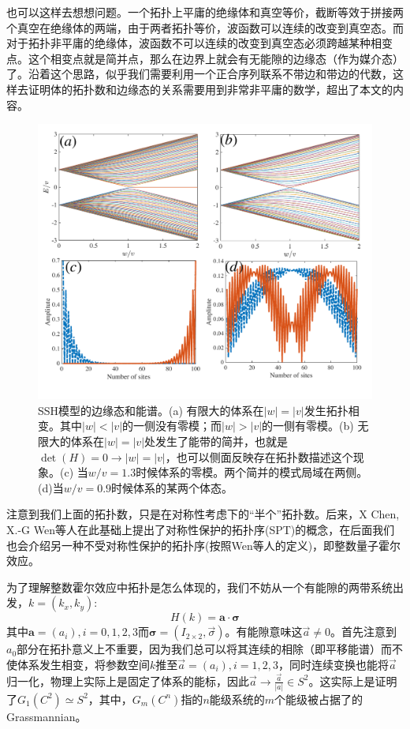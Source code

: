 \documentclass[supercite]{HustGraduPaper}
\begin{document}
也可以这样去想想问题。一个拓扑上平庸的绝缘体和真空等价，截断等效于拼接两个真空在绝缘体的两端，由于两者拓扑等价，波函数可以连续的改变到真空态。而对于拓扑非平庸的绝缘体，波函数不可以连续的改变到真空态必须跨越某种相变点。这个相变点就是简并点，那么在边界上就会有无能隙的边缘态（作为媒介态）了。沿着这个思路，似乎我们需要利用一个正合序列联系不带边和带边的代数，这样去证明体的拓扑数和边缘态的关系需要用到非常非平庸的数学，超出了本文的内容。

\begin{figure}
	\centering
	\includegraphics[width=1\linewidth]{Figures/Fig_wave_no}
	\caption{SSH模型的边缘态和能谱。(a) 有限大的体系在$|w| = |v|$发生拓扑相变。其中$|w|<|v|$的一侧没有零模；而$|w|>|v|$的一侧有零模。(b) 无限大的体系在$|w|=|v|$处发生了能带的简并，也就是$\det(H) = 0\to |w| = |v|$，也可以侧面反映存在拓扑数描述这个现象。(c) 当$w/v = 1.3$时候体系的零模。两个简并的模式局域在两侧。(d)当$w/v = 0.9$时候体系的某两个体态。}
	\label{fig:figwaveno}
\end{figure}

注意到我们上面的拓扑数，只是在对称性考虑下的“半个”拓扑数。后来，X Chen, X.-G Wen等人在此基础上提出了对称性保护的拓扑序(SPT)的概念\cite{wen2013classifying,gu2009tensor,chen2010local}，在后面我们也会介绍另一种不受对称性保护的拓扑序(按照Wen等人的定义)，即整数量子霍尔效应。 

为了理解整数霍尔效应中拓扑是怎么体现的，我们不妨从一个有能隙的两带系统出发，$k = (k_x,k_y)$:
\begin{equation}
H(k) = \mathbf{a}\cdot \bm{\sigma}
\end{equation}
其中$\mathbf{a}= (a_i), i = {0,1,2,3}$而$\bm{\sigma} = (I_{2\times2}, \vec{\sigma})$。有能隙意味这$\vec{a} \ne 0$。首先注意到$a_0$部分在拓扑意义上不重要，因为我们总可以将其连续的相除（即平移能谱）而不使体系发生相变，将参数空间$k$推至$\vec{a} = (a_i), i = 1,2,3$，同时连续变换也能将$\vec{a}$归一化，物理上实际上是固定了体系的能标，因此$\vec{a} \to \frac{\vec{a}}{|a|}\in S^2$。这实际上是证明了$G_1(C^2) \simeq S^2$，其中，$G_m(C^n)$指的$n$能级系统的$m$个能级被占据了的Grassmannian。
\end{document}
